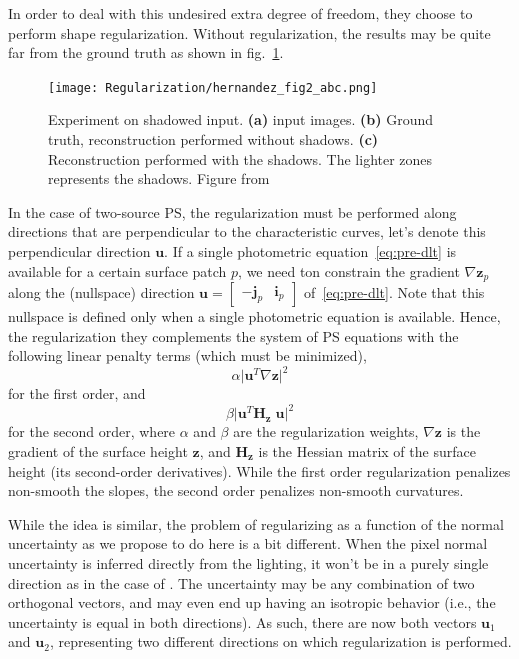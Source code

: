 In order to deal with this undesired extra degree of freedom, they choose to perform shape regularization. Without regularization, the results may be quite far from the ground truth as shown in fig.~\ref{fig:reg-her2}.

\begin{figure}
\centering
\texttt{[image: Regularization/hernandez\_fig2\_abc.png]}
\caption{Experiment on shadowed input. \textbf{(a)} input images. \textbf{(b)} Ground truth, reconstruction performed without shadows. \textbf{(c)} Reconstruction performed with the shadows. The lighter zones represents the shadows. Figure from~\cite{hernandez-pami-11}}
\label{fig:reg-her2}
\end{figure}

In the case of two-source PS, the regularization must be performed along directions that are perpendicular to the characteristic curves, let's denote this perpendicular direction $\mathbf{u}$. If a single photometric equation~\eqref{eq:pre-dlt} is available for a certain surface patch $p$, we need ton constrain the gradient $\nabla \mathbf{z}_p$ along the (nullspace) direction $\mathbf{u} = \begin{bmatrix} -\mathbf{j}_p & \mathbf{i}_p \end{bmatrix}$ of~\eqref{eq:pre-dlt}. Note that this nullspace is defined only when a single photometric equation is available. Hence, the regularization they complements the system of PS equations with the following linear penalty terms (which must be minimized),
\begin{equation}
\alpha \lvert \mathbf{u}^T \nabla \mathbf{z} \rvert ^2
\end{equation}
for the first order, and 
\begin{equation}
\beta \lvert \mathbf{u}^T \mathbf{H_z} \; \mathbf{u} \rvert ^2
\end{equation}
for the second order, where $\alpha$ and $\beta$ are the regularization weights, $\nabla \mathbf{z}$ is the gradient of the surface height $\mathbf{z}$, and $\mathbf{H_z}$ is the Hessian matrix of the surface height (its second-order derivatives). While the first order regularization penalizes non-smooth the slopes, the second order penalizes non-smooth curvatures.

While the idea is similar, the problem of regularizing as a function of the normal uncertainty as we propose to do here is a bit different. When the pixel normal uncertainty is inferred directly from the lighting, it won't be in a purely single direction as in the case of \cite{hernandez-pami-11}. The uncertainty may be any combination of two orthogonal vectors, and may even end up having an isotropic behavior (i.e., the uncertainty is equal in both directions). As such, there are now both vectors $\mathbf{u}_1$ and $\mathbf{u}_2$, representing two different directions on which regularization is performed.

